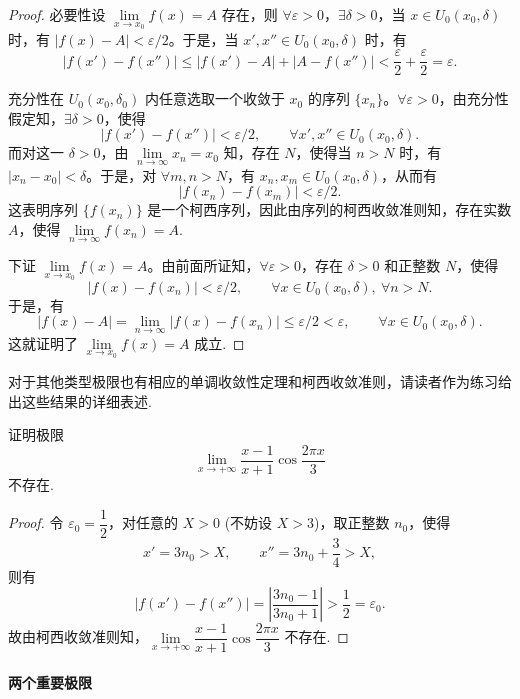\begin{proof}
必要性\quad 设 $\lim\limits_{x\to x_0}f(x)=A$ 存在，则 $\forall\varepsilon>0$，$\exists\delta>0$，当 $x\in U_0(x_0,\delta)$ 时，有 $|f(x)-A|<\varepsilon/2$。于是，当 $x',x''\in U_0(x_0,\delta)$ 时，有
\[
  |f(x')-f(x'')|\leqslant |f(x')-A|+|A-f(x'')|<\frac{\varepsilon}{2}+\frac{\varepsilon}{2}=\varepsilon.
\]

充分性\quad 在 $U_0(x_0,\delta_0)$ 内任意选取一个收敛于 $x_0$ 的序列 $\{x_n\}$。$\forall\varepsilon>0$，由充分性假定知，$\exists\delta>0$，使得
\[
  |f(x')-f(x'')|<\varepsilon/2,\qquad \forall x',x''\in U_0(x_0,\delta).
\]
而对这一 $\delta>0$，由 $\lim\limits_{n\to\infty}x_n=x_0$ 知，存在 $N$，使得当 $n>N$ 时，有 $|x_n-x_0|<\delta$。于是，对 $\forall m,n>N$，有 $x_n,x_m\in U_0(x_0,\delta)$，从而有
\[
  |f(x_n)-f(x_m)|<\varepsilon/2.
\]
这表明序列 $\{f(x_n)\}$ 是一个柯西序列，因此由序列的柯西收敛准则知，存在实数 $A$，使得 $\lim\limits_{n\to\infty}f(x_n)=A$.

下证 $\lim\limits_{x\to x_0}f(x)=A$。由前面所证知，$\forall\varepsilon>0$，存在 $\delta>0$ 和正整数 $N$，使得
\[
  |f(x)-f(x_n)|<\varepsilon/2,\qquad \forall x\in U_0(x_0,\delta),\ \forall n>N.
\]
于是，有
\[
  |f(x)-A|=\lim_{n\to\infty}|f(x)-f(x_n)|\leqslant\varepsilon/2<\varepsilon,\qquad \forall x\in U_0(x_0,\delta).
\]
这就证明了 $\lim\limits_{x\to x_0}f(x)=A$ 成立.
\end{proof}


\begin{remark}\label{remark:ma-3-source-46}
对于其他类型极限也有相应的单调收敛性定理和柯西收敛准则，请读者作为练习给出这些结果的详细表述.
\end{remark}


\begin{example}\label{example:ma-3-1-13}
证明极限
\[
  \lim_{x\to+\infty}\frac{x-1}{x+1}\cos\frac{2\pi x}{3}
\]
不存在.
\end{example}


\begin{proof}
令 $\varepsilon_0=\dfrac12$，对任意的 $X>0$ (不妨设 $X>3$)，取正整数 $n_0$，使得
\[
  x'=3n_0>X,\qquad x''=3n_0+\frac34>X,
\]
则有
\[
  |f(x')-f(x'')|=\left|\frac{3n_0-1}{3n_0+1}\right|>\frac12=\varepsilon_0.
\]
故由柯西收敛准则知，$\lim\limits_{x\to+\infty}\dfrac{x-1}{x+1}\cos\dfrac{2\pi x}{3}$ 不存在.
\end{proof}


\paragraph*{两个重要极限}


